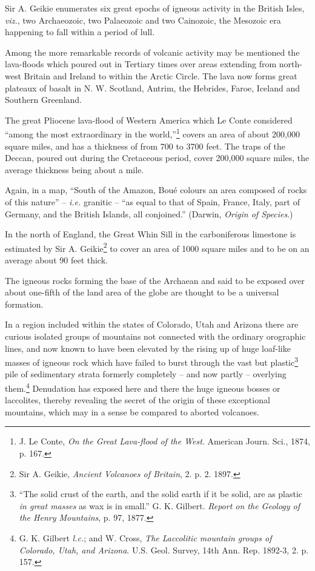 \documentclass[a4paper, 12pt, oneside]{article}
\begin{document}
Sir A. Geikie enumerates six great epochs of igneous activity in the British Isles, \emph{viz.}, two Archaeozoic, two Palaeozoic and two Cainozoic, the Mesozoic era happening to fall within a period of lull.

Among the more remarkable records of volcanic activity may be mentioned the lava-floods which poured out in Tertiary times over areas extending from north-west Britain and Ireland to within the Arctic Circle. The lava now forms great plateaux of basalt in N. W. Scotland, Antrim, the Hebrides, Faroe, Iceland and Southern Greenland.

The great Pliocene lava-flood of Western America which Le Conte considered ``among the most extraordinary in the world,''\footnote{J. Le Conte, \emph{On the Great Lava-flood of the West}. American Journ. Sci., 1874, p. 167.} covers an area of about 200,000 square miles, and has a thickness of from 700 to 3700 feet. The traps of the Deccan, poured out during the Cretaceous period, cover 200,000 square miles, the average thickness being about a mile.

Again, in a map, ``South of the Amazon, Boué colours an area composed of rocks of this nature'' -- \emph{i.e.} granitic -- ``as equal to that of Spain, France, Italy, part of Germany, and the British Islands, all conjoined.'' (Darwin, \emph{Origin of Species}.)

In the north of England, the Great Whin Sill in the carboniferous limestone is estimated by Sir A. Geikie\footnote{Sir A. Geikie, \emph{Ancient Volcanoes of Britain}, 2. p. 2. 1897.} to cover an area of 1000 square miles and to be on an average about 90 feet thick.

The igneous rocks forming the base of the Archaean and said to be exposed over about one-fifth of the land area of the globe are thought to be a universal formation.

In a region included within the states of Colorado, Utah and Arizona there are curious isolated groups of mountains not connected with the ordinary orographic lines, and now known to have been elevated by the rising up of huge loaf-like masses of igneous rock which have failed to burst through the vast but plastic\footnote{``The solid crust of the earth, and the solid earth if it be solid, are as plastic \emph{in great masses} as wax is in small.'' G. K. Gilbert. \emph{Report on the Geology of the Henry Mountains}, p. 97, 1877.} pile of sedimentary strata formerly completely -- and now partly -- overlying them.\footnote{G. K. Gilbert \emph{l.c.}; and W. Cross, \emph{The Laccolitic mountain groups of Colorado, Utah, and Arizona}. U.S. Geol. Survey, 14th Ann. Rep. 1892-3, 2. p. 157.} Denudation has exposed here and there the huge igneous bosses or laccolites, thereby revealing the secret of the origin of these exceptional mountains, which may in a sense be compared to aborted volcanoes.
\end{document}
